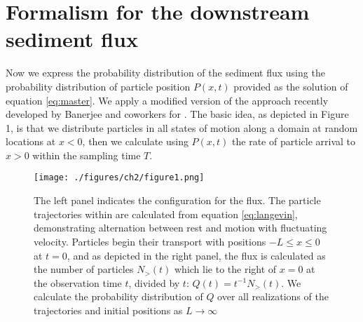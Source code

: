 \section{Formalism for the downstream sediment flux}
Now we express the probability distribution of the sediment flux using the probability distribution of particle position $P(x,t)$ provided as the solution of equation \ref{eq:master}. We apply a modified version of the approach recently developed by Banerjee and coworkers for \citep{Banerjee2020}. The basic idea, as depicted in Figure 1, is that we distribute particles in all states of motion along a domain at random locations at $x<0$, then we calculate using $P(x,t)$ the rate of particle arrival to $x>0$ within the sampling time $T$.
\begin{figure}
	\centerline{\texttt{[image: ./figures/ch2/figure1.png]}}
	\caption{The left panel indicates the configuration for the flux. The particle trajectories within are calculated from equation \ref{eq:langevin}, demonstrating alternation between rest and motion with fluctuating velocity. Particles begin their transport with positions $-L\leq x \leq 0$ at $t=0$, and as depicted in the right panel, the flux is calculated as the number of particles $N_>(t)$ which lie to the right of $x=0$ at the observation time $t$, divided by $t$: $Q(t) = t^{-1}N_>(t)$. We calculate the probability distribution of $Q$ over all realizations of the trajectories and initial positions as $L\rightarrow \infty$}
	\label{fig:fig1}
\end{figure}

